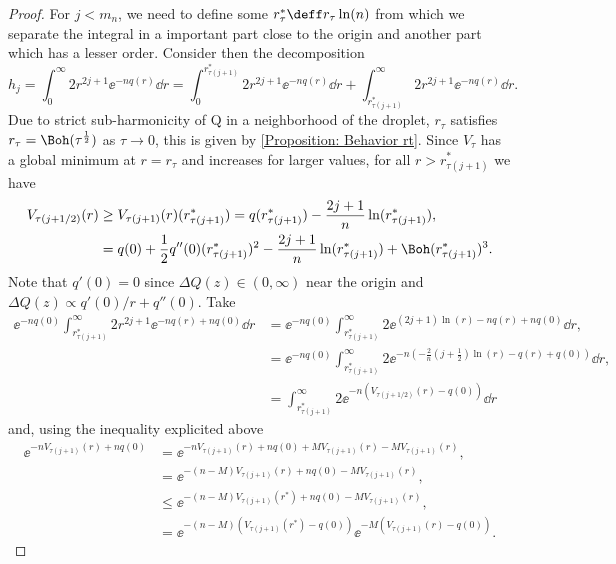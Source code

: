 \begin{proof}
For $j < m_n$, we need to define some $r^*_\tau \deff r_\tau \ln(n)$ from which we separate the integral in a important part close to the origin and another part which has a lesser order. Consider then the decomposition
\begin{equation}
	h_j = \int_{0}^{\infty} 2r^{2j+1} \ee^{-n q(r)} \dd r =\int_{0}^{r^*_{\tau(j+1)}} 2r^{2j+1} \ee^{-n q(r)} \dd r + \int_{r^*_{\tau(j+1)}}^{\infty} 2r^{2j+1} \ee^{-n q(r)} \dd r.
\end{equation}
Due to strict sub-harmonicity of Q in a neighborhood of the droplet, $r_\tau$ satisfies $r_\tau = \Boh (\tau^{\frac{1}{2}})$ as $\tau \rightarrow 0$, this is given by \autoref{Proposition: Behavior rt}. Since $V_\tau$ has a global minimum at $r = r_\tau$ and increases for larger values, for all $r > r^*_{\tau(j + 1)}$ we have
\begin{align}
	V_{\tau(j+1/2)}(r) & \geq V_{\tau(j+1)}(r)(r^*_{\tau(j+1)}) = q(r^*_{\tau(j+1)}) - \frac{2j + 1}{n} \ln(r^*_{\tau(j+1)}), \\
	& = q(0) + \frac{1}{2} q''(0)(r^*_{\tau(j+1)})^2 - \frac{2j + 1}{n} \ln(r^*_{\tau(j+1)}) + \Boh(r^*_{\tau(j+1)})^3.
\end{align}
Note that $q'(0) = 0$ since $\Delta Q(z) \in (0, \infty)$ near the origin and $\Delta Q(z) \propto q'(0)/r + q''(0)$. Take
\begin{align}
	\ee^{-n q(0)} \int_{r^*_{\tau(j+1)}}^{\infty} 2r^{2j+1} \ee^{-n q(r) + n q(0)} \dd r & =  \ee^{-n q(0)} \int_{r^*_{\tau(j+1)}}^{\infty} 2 \ee^{(2j+1) \ln(r) -n q(r) + n q(0)} \dd r, \\
	& = \ee^{-n q(0)} \int_{r^*_{\tau(j+1)}}^{\infty} 2 \ee^{- n \left(-\frac{2}{n}\left( j + \frac{1}{2} \right) \ln(r) - q(r) + q(0)\right)} \dd r, \\
	& = \int_{r^*_{\tau(j+1)}}^{\infty} 2 \ee^{-n (V_{\tau(j+1/2)}(r) - q(0))} \dd r
\end{align}
and, using the inequality explicited above
\begin{align}
	\ee^{- n V_{\tau(j+1)}(r) + n q(0)} & = \ee^{- n V_{\tau(j+1)}(r) + n q(0) + M V_{\tau(j+1)}(r) - M V_{\tau(j+1)}(r)}, \\
	& = \ee^{- (n - M) V_{\tau(j+1)}(r) + n q(0) - M V_{\tau(j+1)}(r)}, \\
	& \leq \ee^{- (n - M) V_{\tau(j+1)}(r^*) + n q(0) - M V_{\tau(j+1)}(r)}, \\
	& = \ee^{- (n - M) \left(V_{\tau(j+1)}(r^*) - q(0) \right)} \ee^{- M \left(V_{\tau(j+1)}(r) - q(0) \right)}.

\end{align}
\end{proof}
